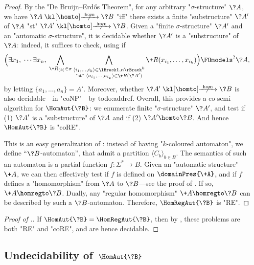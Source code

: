 \begin{proof}
	By the "De Bruijn–Erdős Theorem", for any arbitrary "$\sigma$-structure" $\?A$,
	we have $\?A \nothomto \?B$ "iff" there exists a finite "substructure" $\?A'$ of $\?A$
	"st" $\?A' \nothomto \?B$.
	Given a "finite $\sigma$-structure" $\?A'$ and an "automatic $\sigma$-structure",
	it is decidable whether $\?A'$ is a "substructure" of $\?A$: indeed, it suffices
	to check, using  if
	\[
		\Bigl(
			\exists x_1,\; \cdots \exists x_n,\;
			\bigwedge_{\+R_{(k)} \in \sigma} \bigwedge_{\substack{\tup{i_1,\hdots,i_k} \in \lBrack 1,n\rBrack^k\\\text{"st" }\tup{a_{i_1},\hdots,a_{i_k}} \in \+R(\?A')}}
			\+R(x_{i_1},\hdots,x_{i_k})
		\Bigr)
		\FOmodels^{?} \?A,
	\]
	by letting $\{a_1,\hdots,a_n\} = A'$. 
	Moreover, whether $\?A' \nothomto \?B$ is also decidable---in "coNP"---by todo:addref.
	Overall, this provides a co-semi-algorithm for $\HomAut{\?B}$: we enumerate finite
	"$\sigma$-structure" $\?A'$, and test if (1) $\?A'$ is a "substructure" of $\?A$ and if (2)
	$\?A' \homto \?B$. And hence $\HomAut{\?B}$ is "coRE".

	 This is an easy generalization of
	: instead of having "$k$-coloured automaton", we define
	``$\?B$-automaton'', that admit a partition $\langle C_{b} \rangle_{b \in B}$.
	The semantics of such an automaton is a partial function $f\colon \Sigma^* \to B$. 
	Given an "automatic structure" $\+A$, we can then effectively test if $f$ is defined on $\domainPres{\+A}$, and if $f$ defines a "homomorphism" from $\?A$ to $\?B$---see
	the proof of . If so, $\+A \homregto \?B$. Dually, any "regular homomorphism" $\+A \homregto \?B$ can be described by such a $\?B$-automaton.
	Therefore, $\HomRegAut{\?B}$ is "RE".
\end{proof}

\begin{proof}[Proof of .]
	If $\HomAut{\?B} = \HomRegAut{\?B}$, then by ,
	these problems are both "RE" and "coRE", and are hence decidable.
\end{proof}

\subsection{Undecidability of \,$\HomAut{\?B}$}
\label{sec:undecidability-hom}

